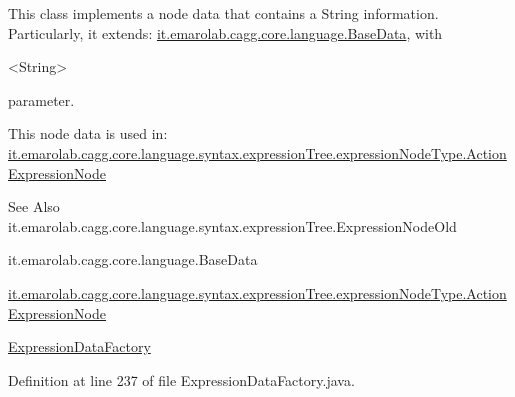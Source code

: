 This class implements a node data that contains a String information. Particularly, it extends\-: \hyperlink{}{it.\-emarolab.\-cagg.\-core.\-language.\-Base\-Data}, with
\begin{DoxyCode}
<String> 
\end{DoxyCode}
 parameter.\par
 This node data is used in\-: \hyperlink{classit_1_1emarolab_1_1cagg_1_1core_1_1language_1_1syntax_1_1expressionTree_1_1expressionNodeType_1_1ActionExpressionNode}{it.\-emarolab.\-cagg.\-core.\-language.\-syntax.\-expression\-Tree.\-expression\-Node\-Type.\-Action\-Expression\-Node} 

\begin{DoxySeeAlso}{See Also}
it.\-emarolab.\-cagg.\-core.\-language.\-syntax.\-expression\-Tree.\-Expression\-Node\-Old 

it.\-emarolab.\-cagg.\-core.\-language.\-Base\-Data 

\hyperlink{classit_1_1emarolab_1_1cagg_1_1core_1_1language_1_1syntax_1_1expressionTree_1_1expressionNodeType_1_1ActionExpressionNode}{it.\-emarolab.\-cagg.\-core.\-language.\-syntax.\-expression\-Tree.\-expression\-Node\-Type.\-Action\-Expression\-Node} 

\hyperlink{classit_1_1emarolab_1_1cagg_1_1core_1_1language_1_1syntax_1_1expressionTree_1_1ExpressionDataFactory}{Expression\-Data\-Factory} 
\end{DoxySeeAlso}


Definition at line 237 of file Expression\-Data\-Factory.\-java.



